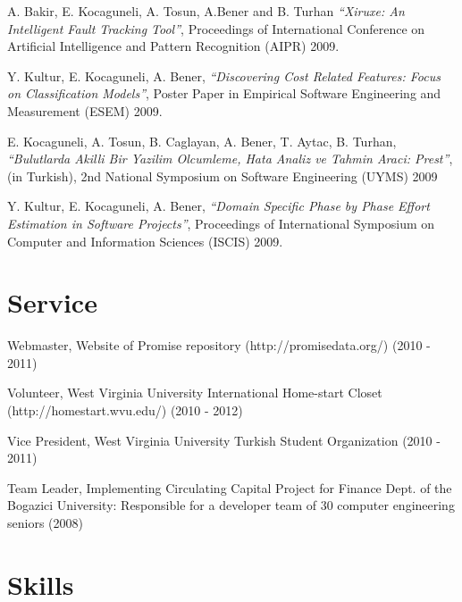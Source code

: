 \documentclass[margin]{res}
\begin{document}
\begin{resume}
\begin{list}{}{\leftmargin=0.5em}
\item A. Bakir, E. Kocaguneli, A. Tosun, A.Bener and B. Turhan \textit{``Xiruxe: An Intelligent Fault Tracking Tool''}, Proceedings of International Conference on Artificial Intelligence and Pattern Recognition (AIPR) 2009.
\item Y. Kultur, E. Kocaguneli, A. Bener, \textit{``Discovering Cost Related Features: Focus on Classification Models''}, Poster Paper in Empirical Software Engineering and Measurement (ESEM) 2009.
\item E. Kocaguneli, A. Tosun, B. Caglayan, A. Bener, T. Aytac, B. Turhan, \textit{``Bulutlarda Akilli Bir Yazilim Olcumleme, Hata Analiz ve Tahmin Araci: Prest''}, (in Turkish), 2nd National Symposium on Software Engineering (UYMS) 2009
\item Y. Kultur, E. Kocaguneli, A. Bener, \textit{``Domain Specific Phase by Phase Effort Estimation in  Software Projects''}, Proceedings of International Symposium on Computer and Information Sciences (ISCIS) 2009.
\end{list}


\section{Service}


\begin{list}{}{\leftmargin=0.5em}
\item Webmaster, Website of Promise repository (http://promisedata.org/) (2010 - 2011)
\item Volunteer, West Virginia University International Home-start Closet (http://homestart.wvu.edu/) (2010 - 2012)
\item Vice President, West Virginia University Turkish Student Organization (2010 - 2011)
\item Team Leader, Implementing Circulating Capital Project for Finance Dept. of the Bogazici University: Responsible for a developer team of 30 computer engineering seniors (2008) 
\end{list}

\section{Skills}


\end{resume}
\end{document}

